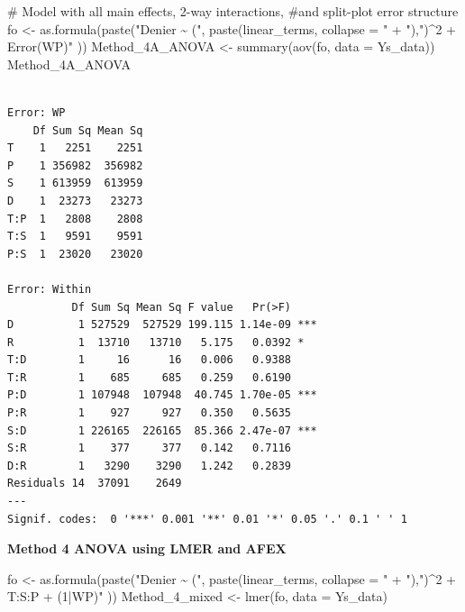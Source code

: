 \documentclass[
  letterpaper,
  DIV=11,
  numbers=noendperiod]{scrartcl}
\newenvironment{Shaded}{\begin{snugshade}}{\end{snugshade}}
\newcommand{\AttributeTok}[1]{\textcolor[rgb]{0.40,0.45,0.13}{#1}}
\newcommand{\CommentTok}[1]{\textcolor[rgb]{0.37,0.37,0.37}{#1}}
\newcommand{\FunctionTok}[1]{\textcolor[rgb]{0.28,0.35,0.67}{#1}}
\newcommand{\NormalTok}[1]{\textcolor[rgb]{0.00,0.23,0.31}{#1}}
\newcommand{\OtherTok}[1]{\textcolor[rgb]{0.00,0.23,0.31}{#1}}
\newcommand{\StringTok}[1]{\textcolor[rgb]{0.13,0.47,0.30}{#1}}
\begin{document}
\begin{Shaded}
\begin{Highlighting}[]
\CommentTok{\# Model with all main effects, 2{-}way interactions,}
\CommentTok{\#and split{-}plot error structure}
\NormalTok{fo }\OtherTok{\textless{}{-}} \FunctionTok{as.formula}\NormalTok{(}\FunctionTok{paste}\NormalTok{(}\StringTok{"Denier \textasciitilde{} ("}\NormalTok{, }
    \FunctionTok{paste}\NormalTok{(linear\_terms, }\AttributeTok{collapse =} \StringTok{" + "}\NormalTok{),}\StringTok{")\^{}2 + Error(WP)"}
\NormalTok{  ))}
\NormalTok{Method\_4A\_ANOVA }\OtherTok{\textless{}{-}} \FunctionTok{summary}\NormalTok{(}\FunctionTok{aov}\NormalTok{(fo, }\AttributeTok{data =}\NormalTok{ Ys\_data))}
\NormalTok{Method\_4A\_ANOVA}
\end{Highlighting}
\end{Shaded}

\begin{verbatim}

Error: WP
    Df Sum Sq Mean Sq
T    1   2251    2251
P    1 356982  356982
S    1 613959  613959
D    1  23273   23273
T:P  1   2808    2808
T:S  1   9591    9591
P:S  1  23020   23020

Error: Within
          Df Sum Sq Mean Sq F value   Pr(>F)    
D          1 527529  527529 199.115 1.14e-09 ***
R          1  13710   13710   5.175   0.0392 *  
T:D        1     16      16   0.006   0.9388    
T:R        1    685     685   0.259   0.6190    
P:D        1 107948  107948  40.745 1.70e-05 ***
P:R        1    927     927   0.350   0.5635    
S:D        1 226165  226165  85.366 2.47e-07 ***
S:R        1    377     377   0.142   0.7116    
D:R        1   3290    3290   1.242   0.2839    
Residuals 14  37091    2649                     
---
Signif. codes:  0 '***' 0.001 '**' 0.01 '*' 0.05 '.' 0.1 ' ' 1
\end{verbatim}

\textbf{Method 4 ANOVA using LMER and AFEX}

\begin{Shaded}
\begin{Highlighting}[]
\NormalTok{fo }\OtherTok{\textless{}{-}} \FunctionTok{as.formula}\NormalTok{(}\FunctionTok{paste}\NormalTok{(}\StringTok{"Denier \textasciitilde{} ("}\NormalTok{, }
    \FunctionTok{paste}\NormalTok{(linear\_terms, }\AttributeTok{collapse =} \StringTok{" + "}\NormalTok{),}\StringTok{")\^{}2 + T:S:P + (1|WP)"}
\NormalTok{  ))}
\NormalTok{Method\_4\_mixed }\OtherTok{\textless{}{-}} \FunctionTok{lmer}\NormalTok{(fo, }\AttributeTok{data =}\NormalTok{ Ys\_data)}
\end{Highlighting}
\end{Shaded}
\end{document}
